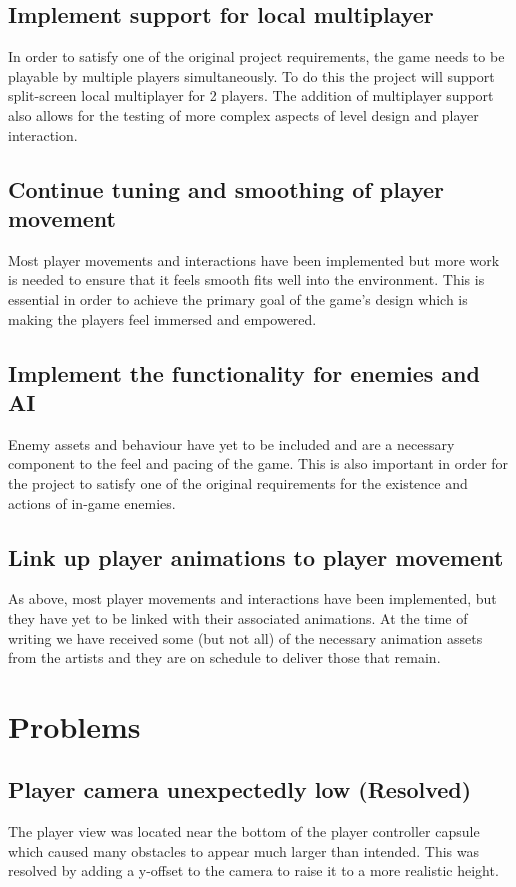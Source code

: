 \documentclass[a4paper,10pt]{article}
\begin{document}
\subsection{Implement support for local multiplayer}
In order to satisfy one of the original project requirements, the game needs to be playable by multiple players simultaneously. To do this the project will support split-screen local multiplayer for 2 players. The addition of multiplayer support also allows for the testing of more complex aspects of level design and player interaction.
\subsection{Continue tuning and smoothing of player movement}
Most player movements and interactions have been implemented but more work is needed to ensure that it feels smooth fits well into the environment. This is essential in order to achieve the primary goal of the game's design which is making the players feel immersed and empowered.
\subsection{Implement the functionality for enemies and AI}
Enemy assets and behaviour have yet to be included and are a necessary component to the feel and pacing of the game. This is also important in order for the project to satisfy one of the original requirements for the existence and actions of in-game enemies.
\subsection{Link up player animations to player movement}
As above, most player movements and interactions have been implemented, but they have yet to be linked with their associated animations. At the time of writing we have received some (but not all) of the necessary animation assets from the artists and they are on schedule to deliver those that remain.

\section{Problems}
\subsection{Player camera unexpectedly low (Resolved)}
The player view was located near the bottom of the player controller capsule which caused many obstacles to appear much larger than intended. This was resolved by adding a y-offset to the camera to raise it to a more realistic height.
\end{document}
